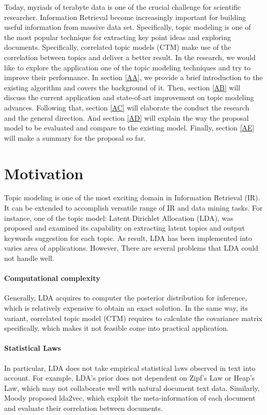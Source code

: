 \label{A}
Today, myriads of terabyte data is one of the crucial challenge for scientific researcher.  Information Retrieval become increasingly important for building useful information from massive data set. Specifically, topic modeling is one of the most popular technique for extracting key point ideas and exploring documents. Specifically, correlated topic models (CTM) make use of the correlation between topics and deliver a better result. In the research, we would like to explore the application one of the topic modeling techniques and try to improve their performance. In section \ref{AA}, we provide a brief introduction to the existing algorithm and covers the background of it. Then, section \ref{AB} will discuss the current application and state-of-art improvement on topic modeling advances. Following that, section \ref{AC} will elaborate the conduct the research and the general direction. And section \ref{AD} will explain the way the proposal model to be evaluated and compare to the existing model. Finally, section \ref{AE} will make a summary for the proposal so far.
\section{Motivation}
Topic modeling is one of the most exciting domain in Information Retrieval (IR). It can be extended to accomplish versatile range of IR and data mining tasks. For instance, one of the topic model: Latent Dirichlet Allocation (LDA), was proposed and examined its capability on extracting latent topics and output keywords suggestion for each topic. As result, LDA has been implemented into varies area of applications. However, There are several problems that LDA could not handle well.
\paragraph{Computational complexity}
Generally, LDA acquires to computer the posterior distribution for inference, which is relatively expensive to obtain an exact solution. In the same way, its variant, correlated topic model (CTM) requires to calculate the covariance matrix specifically, which makes it not feasible come into practical application.
\paragraph{Statistical Laws}In particular, LDA does not take empirical statistical laws observed in text into account. For example, LDA's prior does not dependent on Zipf's Law or Heap's Law, which may not collaborate well with natural document text data. Similarly, Moody\cite{moody_mixing_2016} proposed lda2vec, which exploit the meta-information of each document and evaluate their correlation between documents.
